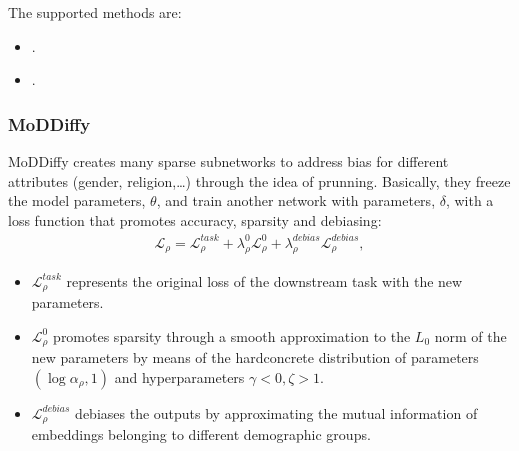 \documentclass[letterpaper,10pt,english]{sphinxmanual}
\begin{document}
\sphinxAtStartPar
The supported methods are:
\begin{itemize}
\item {} 
\sphinxAtStartPar
{\hyperref[\detokenize{algorithms_intraprocessors:diff}]{}} .

\item {} 
\sphinxAtStartPar
{\hyperref[\detokenize{algorithms_intraprocessors:eat}]{}} .

\end{itemize}


\subsubsection{MoDDiffy}
\label{\detokenize{algorithms_intraprocessors:moddiffy}}\label{\detokenize{algorithms_intraprocessors:diff}}
\sphinxAtStartPar
MoDDiffy  creates many sparse subnetworks to address bias for different attributes
(gender, religion,…) through the idea of  prunning. Basically, they freeze the model parameters, \(\theta\),
and train another network with parameters, \(\delta\), with a loss function that promotes accuracy, sparsity and debiasing:
\begin{equation*}
\begin{split}\mathcal{L}_\rho = \mathcal{L}^{task}_{\rho} + \lambda_{\rho}^0 \mathcal{L}^{0}_{\rho} + \lambda_{\rho}^{debias} \mathcal{L}_{\rho}^{debias},\end{split}
\end{equation*}\begin{description}
\begin{itemize}
\item {} 
\sphinxAtStartPar
\(\mathcal{L}_{\rho}^{task}\) represents the original loss of the downstream task with the new parameters.

\item {} 
\sphinxAtStartPar
\(\mathcal{L}_{\rho}^{0}\) promotes sparsity through a smooth approximation to the \(L_0\) norm of the new parameters by means of the hard\sphinxhyphen{}concrete distribution of parameters \((\log \alpha_{\rho}, 1)\) and hyper\sphinxhyphen{}parameters \(\gamma < 0, \zeta > 1\).

\item {} 
\sphinxAtStartPar
\(\mathcal{L}_{\rho}^{debias}\) debiases the outputs by approximating the mutual information of embeddings belonging to different demographic groups.

\end{itemize}

\end{description}
\end{document}
